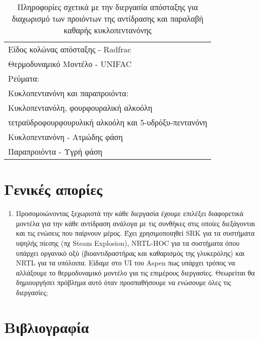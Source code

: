 \documentclass[11pt]{article}
\begin{document}
\begin{table}[htbp]
\caption{Πληροφορίες σχετικά με την διεργασία απόσταξης για διαχωρισμό των προιόντων της αντίδρασης και παραλαβή καθαρής κυκλοπεντανόνης}
\centering
\begin{tabular}{l}
\hline
Είδος κολώνας απόσταξης - Radfrac\\
Θερμοδυναμικό Μοντέλο - UNIFAC\\
Ρεύματα:\\
\hline
Κυκλοπεντανόνη και παραπροιόντα:\\
Κυκλοπεντανόλη, φουρφουραλική αλκοόλη\\
τετραϋδροφουρφουρυλική αλκοόλη και 5-υδρόξυ-πεντανόνη\\
\hline
Κυκλοπεντανόνη - Ατμώδης φάση\\
Παραπροιόντα - Υγρή φάση\\
\hline
\end{tabular}
\end{table}

\section{Γενικές απορίες}
\label{sec:org32f2aa6}
\begin{enumerate}
\item Προσομοιώνοντας ξεχωριστά την κάθε διεργασία έχουμε επιλέξει διαφορετικά μοντέλα για την κάθε αντίδραση ανάλογα με τις συνθήκες στις οποίες διεξάγονται και τις ενώσεις που παίρνουν μέρος. Έχει χρησιμοποιηθεί SRK για τα συστήματα υψηλής πίεσης (πχ Steam Explosion), NRTL-HOC για τα συστήματα όπου υπάρχει οργανικό οξύ (βιοαντιδραστήρας και καθαρισμός της γλυκερόλης) και NRTL για τα υπόλοιπα. Είδαμε στο UI του Aspen πως υπάρχει τρόπος να αλλάξουμε το θερμοδυναμικό μοντέλο για τις επιμέρους διεργασίες. Θεωρείται θα δημιουργήσει πρόβλημα αυτό όταν προσπαθήσουμε να ενώσουμε όλες τις διεργασίες;
\end{enumerate}

\section{Βιβλιογραφία}
\label{sec:org1617477}


\end{document}
